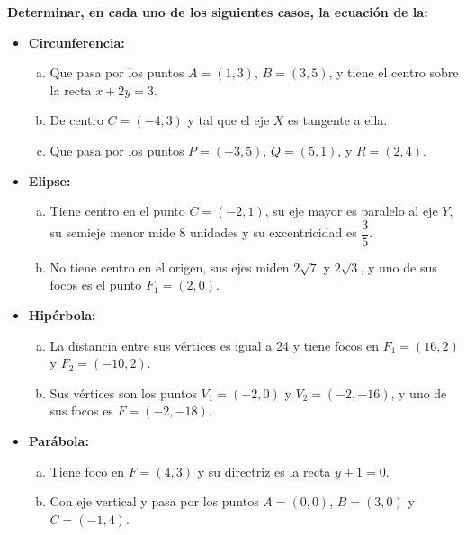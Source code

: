 \documentclass[11pt]{article}
\begin{document}
\noindent\textbf{Determinar, en cada uno de los siguientes casos, la ecuación de la:}
\hspace{-7mm}\begin{itemize} 
\item \textbf{Circunferencia:}
\begin{enumerate}[a)]
    \item Que pasa por los puntos \( A = (1,3) \), \( B = (3,5) \), y tiene el centro sobre la recta \( x + 2y = 3 \).
    
    \item De centro \( C = (-4, 3) \) y tal que el eje \( X \) es tangente a ella.
    
    \item Que pasa por los puntos \( P = (-3,5) \), \( Q = (5,1) \), y \( R = (2,4) \).
\end{enumerate}

\item \textbf{Elipse:}
\begin{enumerate}[a)]
    \item Tiene centro en el punto \( C = (-2,1) \), su eje mayor es paralelo al eje \( Y \), su semieje menor mide 8 unidades y su excentricidad es \( \dfrac{3}{5} \).
    
    \item No tiene centro en el origen, sus ejes miden \( 2\sqrt{7} \) y \( 2\sqrt{3} \), y uno de sus focos es el punto \( F_1 = (2, 0) \).
\end{enumerate}

\item \textbf{Hipérbola:}
\begin{enumerate}[a)]
    \item La distancia entre sus vértices es igual a 24 y tiene focos en \( F_1 = (16, 2) \) y \( F_2 = (-10, 2) \).
    
    \item Sus vértices son los puntos \( V_1 = (-2, 0) \) y \( V_2 = (-2, -16) \), y uno de sus focos es \( F = (-2, -18) \).
\end{enumerate}

\item \textbf{Parábola:}
\begin{enumerate}[a)]
    \item Tiene foco en \( F = (4, 3) \) y su directriz es la recta \( y + 1 = 0 \).
    
    \item Con eje vertical y pasa por los puntos \( A = (0,0) \), \( B = (3,0) \) y \( C = (-1,4) \).
\end{enumerate}

\end{itemize}
\end{document}
